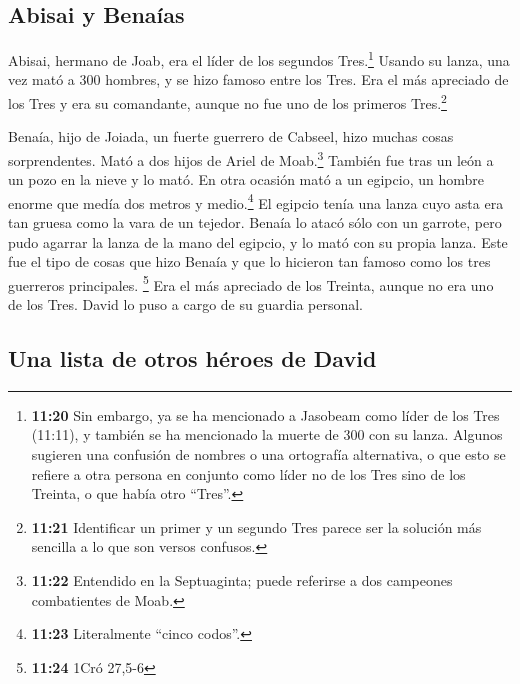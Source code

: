 \hypertarget{abisai-y-benauxedas}{%
\subsection{Abisai y Benaías}\label{abisai-y-benauxedas}}

 Abisai, hermano de Joab, era el líder de los segundos
Tres.\footnote{\textbf{11:20} Sin embargo, ya se ha mencionado a
  Jasobeam como líder de los Tres (11:11), y también se ha mencionado la
  muerte de 300 con su lanza. Algunos sugieren una confusión de nombres
  o una ortografía alternativa, o que esto se refiere a otra persona en
  conjunto como líder no de los Tres sino de los Treinta, o que había
  otro ``Tres''.} Usando su lanza, una vez mató a 300 hombres, y se hizo
famoso entre los Tres.  Era el más apreciado de los Tres
y era su comandante, aunque no fue uno de los primeros Tres.\footnote{\textbf{11:21}
  Identificar un primer y un segundo Tres parece ser la solución más
  sencilla a lo que son versos confusos.}

 Benaía, hijo de Joiada, un fuerte guerrero de Cabseel,
hizo muchas cosas sorprendentes. Mató a dos hijos de Ariel de
Moab.\footnote{\textbf{11:22} Entendido en la Septuaginta; puede
  referirse a dos campeones combatientes de Moab.} También fue tras un
león a un pozo en la nieve y lo mató.  En otra ocasión
mató a un egipcio, un hombre enorme que medía dos metros y
medio.\footnote{\textbf{11:23} Literalmente ``cinco codos''.} El egipcio
tenía una lanza cuyo asta era tan gruesa como la vara de un tejedor.
Benaía lo atacó sólo con un garrote, pero pudo agarrar la lanza de la
mano del egipcio, y lo mató con su propia lanza.  Este
fue el tipo de cosas que hizo Benaía y que lo hicieron tan famoso como
los tres guerreros principales. \footnote{\textbf{11:24} 1Cró 27,5-6}
 Era el más apreciado de los Treinta, aunque no era uno
de los Tres. David lo puso a cargo de su guardia personal.

\hypertarget{una-lista-de-otros-huxe9roes-de-david}{%
\subsection{Una lista de otros héroes de
David}\label{una-lista-de-otros-huxe9roes-de-david}}

